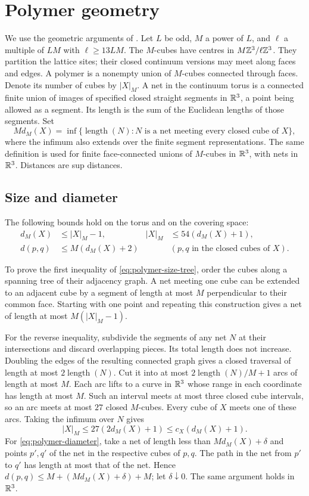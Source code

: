 \section{Polymer geometry}\label{app:polymer-geometry}

We use the geometric arguments of \cite[Appendix~A]{QED3Manuscript}.
Let $L$ be odd, $M$ a power of $L$, and $\ell$ a multiple of $LM$
with $\ell\ge13LM$. The $M$-cubes have centres in
$M\mathbb Z^3/\ell\mathbb Z^3$. They partition the lattice sites; their closed
continuum versions may meet along faces and edges. A polymer is a
nonempty union of $M$-cubes connected through faces. Denote its number
of cubes by $|X|_M$. A net in the continuum torus is a connected
finite union of images of specified closed straight segments
in $\mathbb R^3$, a point being allowed as a segment.
Its length is the sum of the Euclidean lengths of those segments.
Set
\[
 Md_M(X)=\inf\{\operatorname{length}(N):N
             \text{ is a net meeting every closed cube of }X\},
\]
where the infimum also extends over the finite segment representations.
The same definition is used for finite face-connected unions of
$M$-cubes in $\mathbb R^3$, with nets in $\mathbb R^3$. Distances are sup distances.


\subsection{Size and diameter}
The following bounds hold on the torus and on the covering space:
\begin{align}
 d_M(X)&\le |X|_M-1,&
 |X|_M&\le54(d_M(X)+1),\label{eq:polymer-size-tree}\\
 d(p,q)&\le M(d_M(X)+2)
       &&(p,q\text{ in the closed cubes of }X).
                                  \label{eq:polymer-diameter}
\end{align}

To prove the first inequality of \eqref{eq:polymer-size-tree}, order
the cubes along a spanning tree of their adjacency graph. A net
meeting one cube can be extended to an adjacent cube by a segment of
length at most $M$ perpendicular to their common face. Starting with
one point and repeating this construction gives a net of length at
most $M(|X|_M-1)$.

For the reverse inequality, subdivide the segments of any net $N$ at
their intersections and discard overlapping pieces. Its total length
does not increase. Doubling the edges of the resulting connected
graph gives a closed traversal of length at most
$2\operatorname{length}(N)$. Cut it into at most
$2\operatorname{length}(N)/M+1$ arcs of length at most $M$.
Each arc lifts to a curve in $\mathbb R^3$ whose range in each coordinate
has length at most $M$. Such an interval meets at most three closed
cube intervals, so an arc meets at most $27$ closed $M$-cubes.
Every cube of $X$ meets one of these arcs. Taking the infimum over
$N$ gives
\[
 |X|_M\le27(2d_M(X)+1)\le c_X(d_M(X)+1).
\]
For \eqref{eq:polymer-diameter}, take a net of length less than
$Md_M(X)+\delta$ and points $p',q'$ of the net in the respective
cubes of $p,q$. The path in the net from $p'$ to $q'$ has length
at most that of the net. Hence
$d(p,q)\le M+(Md_M(X)+\delta)+M$; let $\delta\downarrow0$.
The same argument holds in $\mathbb R^3$.

